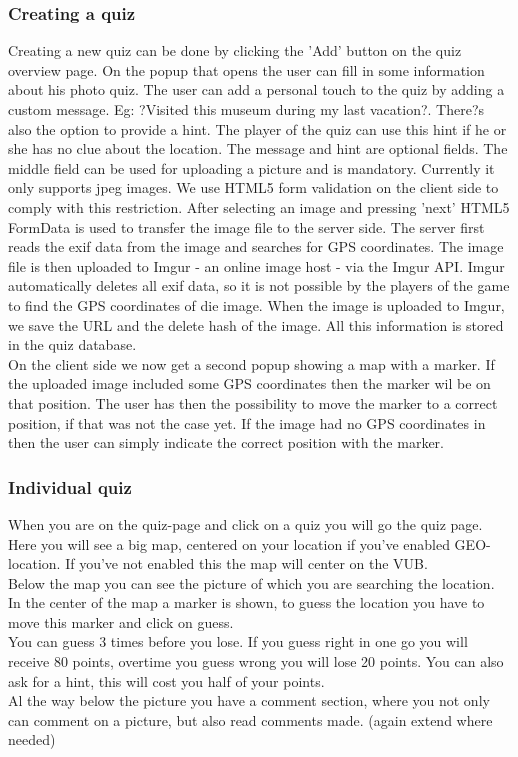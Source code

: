 \documentclass[11pt, oneside]{article}   	%
\begin{document}
\subsubsection{Creating a quiz}
Creating a new quiz can be done by clicking the 'Add' button on the quiz overview page. On the popup that opens the user can fill in some information about his photo quiz. The user can add a personal touch to the quiz by adding a custom message. Eg: ?Visited this museum during my last vacation?. There?s also the option to provide a hint. The player of the quiz can use this hint if he or she has no clue about the location. The message and hint are optional fields. The middle field can be used for uploading a picture and is mandatory. Currently it only supports jpeg images. We use HTML5 form validation on the client side to comply with this restriction. 
After selecting an image and pressing 'next' HTML5 FormData is used to transfer the image file to the server side. The server first reads the exif data from the image and searches for GPS coordinates. The image file is then uploaded to Imgur - an online image host - via the Imgur API. Imgur automatically deletes all exif data, so it is not possible by the players of the game to find the GPS coordinates of die image. When the image is uploaded to Imgur, we save the URL and the delete hash of the image. All this information is stored in the quiz database. \\
On the client side we now get a second popup showing a map with a marker. If the uploaded image included some GPS coordinates then the marker wil be on that position. The user has then the possibility to move the marker to a correct position, if that was not the case yet. If the image had no GPS coordinates in then the user can simply indicate the correct position with the marker. 

\subsubsection{Individual quiz}
When you are on the quiz-page and click on a quiz you will go the quiz page. Here you will see a big map, centered on your location if you've enabled GEO-location. If you've not enabled this the map will center on the VUB. \\
Below the map you can see the picture of which you are searching the location. In the center of the map a marker is shown, to guess the location you have to move this marker and click on guess. \\
You can guess 3 times before you lose. If you guess right in one go you will receive 80 points, overtime you guess wrong you will lose 20 points. You can also ask for a hint, this will cost you half of your points.\\
Al the way below the picture you have a comment section, where you not only can comment on a picture, but also read comments made.
(again extend where needed)
\end{document}
